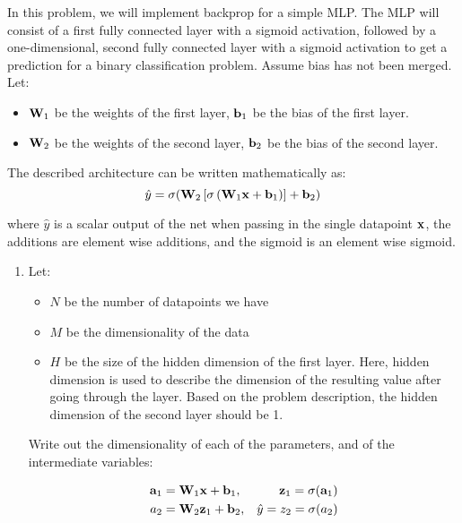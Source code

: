 \documentclass[submit]{harvardml}
\begin{document}
\begin{problem}[Backprop]

  In this problem, we will implement backprop for a simple MLP. The MLP will consist of a first fully connected layer with a sigmoid activation, followed by a one-dimensional, second fully connected layer with a sigmoid activation to get a prediction for a binary classification problem. Assume bias has not been merged. Let:
  \begin{itemize}
      \item $\bold{W}_1$ be the weights of the first layer, $\bold{b}_1$ be the bias of the first layer.
      \item $\bold{W}_2$ be the weights of the second layer, $\bold{b}_2$ be the bias of the second layer.
  \end{itemize}
  
  The described architecture can be written mathematically as: $$\hat{y} = \sigma(\bold{W}_2 \left[\sigma \left(\bold{W}_1 \bold{x} + \bold{b}_1\right)\right] + \bold{b}_2)$$
  
  where $\hat{y}$ is a scalar output of the net when passing in the single datapoint $\bold{x}$, the additions are element wise additions, and the sigmoid is an element wise sigmoid.
  
  \begin{enumerate}
      \item Let:
      \begin{itemize}
          \item $N$ be the number of datapoints we have
          \item $M$ be the dimensionality of the data
          \item $H$ be the size of the hidden dimension of the first layer. Here, hidden dimension is used to describe the dimension of the resulting value after going through the layer. Based on the problem description, the hidden dimension of the second layer should be 1.
      \end{itemize}
      
      Write out the dimensionality of each of the parameters, and of the intermediate variables:

          \begin{align*}
          \bold{a}_1 &= \bold{W}_1 \bold{x} + \bold{b}_1, 
          &\bold{z}_1 = \sigma(\bold{a}_1) \\
          a_2 &= \bold{W}_2 \bold{z}_1 + \bold{b}_2, 
          &\hat{y} = z_2 = \sigma(a_2)
          \end{align*}
          

\end{enumerate}
\end{problem}
\end{document}
